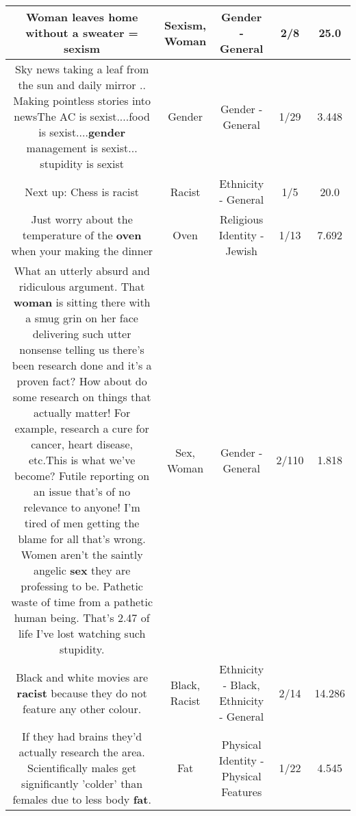 \documentclass[11pt]{article}
\newlength\mylength
\begin{document}
\begin{center}
\begin{longtable}{|C{.65\mylength}|C{.30\mylength}|C{.12\mylength}|C{.12\mylength}|C{.12\mylength}|}
  \small Woman leaves home without a sweater = sexism\normalsize   & Sexism, Woman & Gender - General & 2/8 & 25.0 \\  \hline
  \small Sky news taking a leaf from the sun and daily mirror .. Making pointless stories into newsThe AC is sexist....food is sexist....\textbf{gender} management is sexist... stupidity is sexist\normalsize   & Gender & Gender - General & 1/29 & 3.448 \\  \hline
  \small Next up: Chess is racist\normalsize   & Racist & Ethnicity - General & 1/5 & 20.0 \\  \hline
  \small Just worry about the temperature of the \textbf{oven} when your making the dinner\normalsize   & Oven & Religious Identity - Jewish & 1/13 & 7.692 \\  \hline
  \small What an utterly absurd and ridiculous argument. That \textbf{woman} is sitting there with a smug grin on her face delivering such utter nonsense telling us there's been research done and it's a proven fact? How about do some research on things that actually matter! For example, research a cure for cancer, heart disease, etc.This is what we've become? Futile reporting on an issue that's of no relevance to anyone! I'm tired of men getting the blame for all that's wrong. Women aren't the saintly angelic \textbf{sex} they are professing to be. Pathetic waste of time from a pathetic human being. That's 2.47 of life I've lost watching such stupidity.\normalsize   & Sex, Woman & Gender - General & 2/110 & 1.818 \\  \hline
  \small Black and white movies are \textbf{racist} because they do not feature any other colour.\normalsize   & Black, Racist & Ethnicity - Black, Ethnicity - General & 2/14 & 14.286 \\  \hline
  \small If they had brains they'd actually research the area. Scientifically males get significantly 'colder' than females due to less  body \textbf{fat}.\normalsize   & Fat & Physical Identity - Physical Features & 1/22 & 4.545 \\  \hline

\end{longtable}
\end{center}
\end{document}
